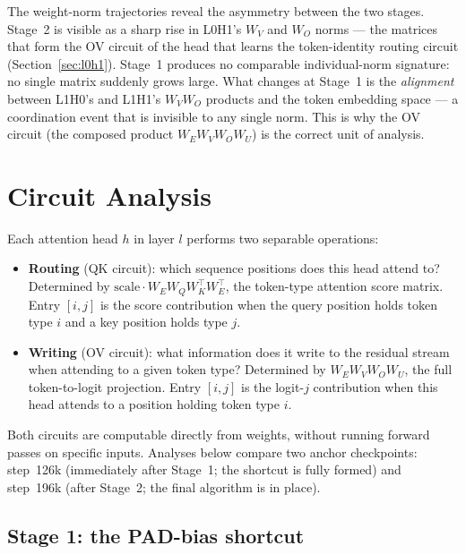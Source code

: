 \documentclass[11pt, a4paper]{article}
\begin{document}
The weight-norm trajectories reveal the asymmetry between the two
stages.  Stage~2 is visible as a sharp rise in L0H1's $W_V$ and $W_O$
norms --- the matrices that form the OV circuit of the head that learns
the token-identity routing circuit (Section~\ref{sec:l0h1}).
Stage~1 produces no comparable individual-norm signature: no single
matrix suddenly grows large.  What changes at Stage~1 is the
\emph{alignment} between L1H0's and L1H1's $W_V W_O$ products and the
token embedding space --- a coordination event that is invisible to any
single norm.  This is why the OV circuit (the composed product
$W_E W_V W_O W_U$) is the correct unit of analysis.

\section{Circuit Analysis}
\label{sec:circuits}

Each attention head $h$ in layer $l$ performs two separable operations:

\begin{itemize}[noitemsep]
  \item \textbf{Routing} (QK circuit): which sequence positions does this
    head attend to?  Determined by
    $\mathrm{scale} \cdot W_E W_Q W_K^\top W_E^\top$, the
    token-type attention score matrix.  Entry $[i,j]$ is the score
    contribution when the query position holds token type $i$ and a
    key position holds type $j$.

  \item \textbf{Writing} (OV circuit): what information does it write
    to the residual stream when attending to a given token type?
    Determined by $W_E W_V W_O W_U$, the full token-to-logit
    projection.  Entry $[i,j]$ is the logit-$j$ contribution when this
    head attends to a position holding token type $i$.
\end{itemize}

Both circuits are computable directly from weights, without running
forward passes on specific inputs.  Analyses below compare two anchor
checkpoints: step~126k (immediately after Stage~1; the shortcut is
fully formed) and step~196k (after Stage~2; the final algorithm is in
place).

\subsection{Stage 1: the PAD-bias shortcut}
\label{sec:stage1}
\end{document}
